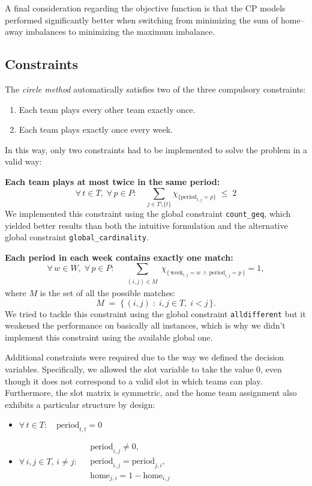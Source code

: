 \documentclass{article}
\begin{document}
A final consideration regarding the objective function is that the CP models performed significantly better when switching from minimizing the sum of home–away imbalances to minimizing the maximum imbalance.

\subsection{Constraints}
The \emph{circle method} automatically satisfies two of the three compulsory constraints:
\begin{enumerate}
    \item Each team plays every other team exactly once.
    \item Each team plays exactly once every week.
\end{enumerate}

In this way, only two constraints had to be implemented to solve the problem in a valid way:

\textbf{Each team plays at most twice in the same period:}
\[
\forall\, t \in T,\; \forall\, p \in P:\quad 
\sum_{j \in T \setminus \{t\}} \chi_{\{\text{period}_{t,j} = p\}} \;\leq\; 2
\]
We implemented this constraint using the global constraint \texttt{count\_geq}, which yielded better results than both the intuitive formulation and the alternative global constraint \texttt{global\_cardinality}.

\textbf{Each period in each week contains exactly one match:}
\[
\forall\, w \in W,\;
\forall\, p \in P:\quad
\sum_{\substack{(i,j) \in M}}
\chi_{\{\,\text{week}_{i,j} = w \,\wedge\, \text{period}_{i,j} = p\,\}} = 1,
\]
where $M$ is the set of all the possible matches: \[
M \;=\; \bigl\{\,(i,j) \;:\; i,j \in T,\; i<j \,\bigr\}.
\]
We tried to tackle this constraint using the global constraint \texttt{alldifferent} but it weakened the performance on basically all instances, which is why we didn't implement this constraint using the available global one.

Additional constraints were required due to the way we defined the decision variables. Specifically, we allowed the slot variable to take the value $0$, even though it does not correspond to a valid slot in which teams can play. Furthermore, the slot matrix is symmetric, and the home team assignment also exhibits a particular structure by design:
\begin{itemize}
    \item $\forall\, t \in T:\quad \text{period}_{t,t} = 0$
    \item  $\forall\, i,j \in T,\, i \ne j:\;
\begin{aligned}
& \text{period}_{i,j} \ne 0,\\
& \text{period}_{i,j} = \text{period}_{j,i},\\
& \text{home}_{j,i} = 1 - \text{home}_{i,j}
\end{aligned}$
\end{itemize}
\end{document}

